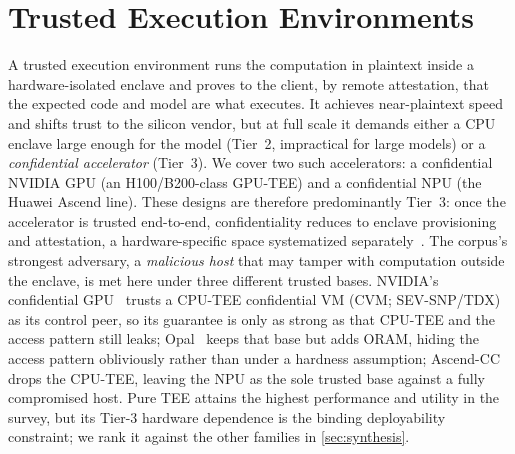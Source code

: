 \section{Trusted Execution Environments}
\label{sec:tee}

A trusted execution environment runs the computation in plaintext inside a
hardware-isolated enclave and proves to the client, by remote attestation, that the expected
code and model are what executes. It achieves near-plaintext speed and shifts trust to the
silicon vendor, but at full scale it demands either a CPU enclave large enough for the model
(Tier~2, impractical for large models) or a \emph{confidential accelerator} (Tier~3). We cover
two such accelerators: a confidential NVIDIA GPU (an H100/B200-class GPU-TEE) and a confidential
NPU (the Huawei Ascend line). These designs are therefore predominantly Tier~3: once the accelerator is trusted end-to-end,
confidentiality reduces to enclave provisioning and attestation, a hardware-specific space
systematized separately~\citep{accel_tee_sok}. The corpus's strongest adversary, a \emph{malicious host} that may tamper with computation outside
the enclave, is met here under three different trusted bases. NVIDIA's confidential
GPU~\citep{h100cc} trusts a CPU-TEE confidential VM (CVM; SEV-SNP/TDX) as its control peer, so
its guarantee is only as strong as that CPU-TEE and the access pattern still leaks; Opal~\citep{kaviani_opal} keeps that
base but adds ORAM, hiding the access pattern obliviously rather than under a hardness assumption;
Ascend-CC~\citep{ascend_cc} drops the CPU-TEE, leaving the NPU as the sole trusted base against a
fully compromised host. Pure TEE attains the highest
performance and utility in the survey, but its Tier-3 hardware dependence is the binding
deployability constraint; we rank it against the other families in \cref{sec:synthesis}.

